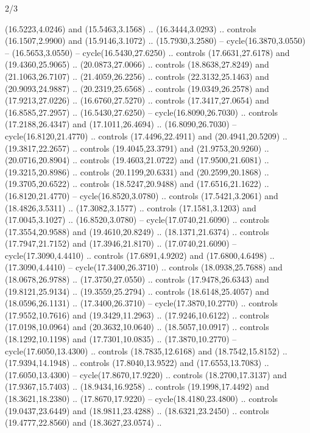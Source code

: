 \begin{flagdescription}{2/3}
\begin{scope}[yshift=\flagwidth,scale=\flagwidth/1241.93737]
\begin{scope}[y=-1mm, x=1mm,draw=gold,fill=blue,line join=miter,miter limit=4,line width=1.8\lw]
\begin{scope}[y=1mm, x=1mm, yscale=-1,shift={(573.68mm+\str,145.75)}]
\begin{scope}[scale=1.35,shift={(-9,-3)}]
\begin{scope}[scale=0.55]
\begin{scope}[scale=1.333]
    (16.5223,4.0246) and (15.5463,3.1568) .. (16.3444,3.0293) .. controls
    (16.1507,2.9900) and (15.9146,3.1072) .. (15.7930,3.2580) --
    cycle(16.3870,3.0550) -- (16.5653,3.0550) -- cycle(16.5430,27.6250) ..
    controls (17.6631,27.6178) and (19.4360,25.9065) .. (20.0873,27.0066) ..
    controls (18.8638,27.8249) and (21.1063,26.7107) .. (21.4059,26.2256) ..
    controls (22.3132,25.1463) and (20.9093,24.9887) .. (20.2319,25.6568) ..
    controls (19.0349,26.2578) and (17.9213,27.0226) .. (16.6760,27.5270) ..
    controls (17.3417,27.0654) and (16.8585,27.2957) .. (16.5430,27.6250) --
    cycle(16.8090,26.7030) .. controls (17.2188,26.4347) and (17.1011,26.4694) ..
    (16.8090,26.7030) -- cycle(16.8120,21.4770) .. controls (17.4496,22.4911) and
    (20.4941,20.5209) .. (19.3817,22.2657) .. controls (19.4045,23.3791) and
    (21.9753,20.9260) .. (20.0716,20.8904) .. controls (19.4603,21.0722) and
    (17.9500,21.6081) .. (19.3215,20.8986) .. controls (20.1199,20.6331) and
    (20.2599,20.1868) .. (19.3705,20.6522) .. controls (18.5247,20.9488) and
    (17.6516,21.1622) .. (16.8120,21.4770) -- cycle(16.8520,3.0780) .. controls
    (17.5421,3.2061) and (18.4826,3.5311) .. (17.3082,3.1577) .. controls
    (17.1581,3.1203) and (17.0045,3.1027) .. (16.8520,3.0780) --
    cycle(17.0740,21.6090) .. controls (17.3554,20.9588) and (19.4610,20.8249) ..
    (18.1371,21.6374) .. controls (17.7947,21.7152) and (17.3946,21.8170) ..
    (17.0740,21.6090) -- cycle(17.3090,4.4410) .. controls (17.6891,4.9202) and
    (17.6800,4.6498) .. (17.3090,4.4410) -- cycle(17.3400,26.3710) .. controls
    (18.0938,25.7688) and (18.0678,26.9788) .. (17.3750,27.0550) .. controls
    (17.9478,26.6343) and (19.8121,25.9134) .. (19.3559,25.2794) .. controls
    (18.6148,25.4057) and (18.0596,26.1131) .. (17.3400,26.3710) --
    cycle(17.3870,10.2770) .. controls (17.9552,10.7616) and (19.3429,11.2963) ..
    (17.9246,10.6122) .. controls (17.0198,10.0964) and (20.3632,10.0640) ..
    (18.5057,10.0917) .. controls (18.1292,10.1198) and (17.7301,10.0835) ..
    (17.3870,10.2770) -- cycle(17.6050,13.4300) .. controls (18.7835,12.6168) and
    (18.7542,15.8152) .. (17.9394,14.1948) .. controls (17.8040,13.9522) and
    (17.6553,13.7083) .. (17.6050,13.4300) -- cycle(17.8670,17.9220) .. controls
    (18.2700,17.3137) and (17.9367,15.7403) .. (18.9434,16.9258) .. controls
    (19.1998,17.4492) and (18.3621,18.2380) .. (17.8670,17.9220) --
    cycle(18.4180,23.4800) .. controls (19.0437,23.6449) and (18.9811,23.4288) ..
    (18.6321,23.2450) .. controls (19.4777,22.8560) and (18.3627,23.0574) ..

\end{scope}
\end{scope}
\end{scope}
\end{scope}
\end{scope}
\end{scope}
\end{flagdescription}

